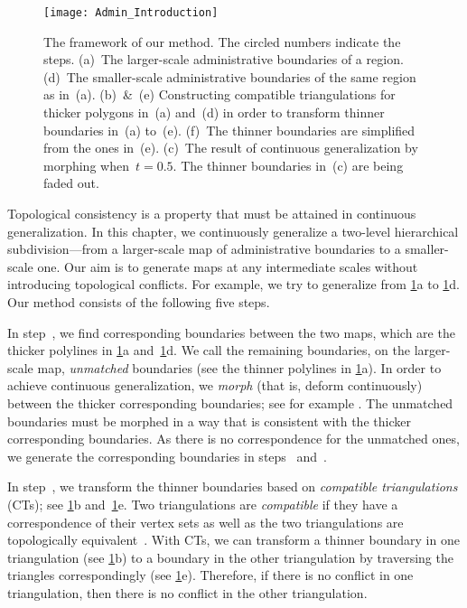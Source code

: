 \begin{figure}[tb]	
\centering
\texttt{[image: Admin\_Introduction]}
\caption{The framework of our method.
	The circled numbers indicate the steps. 
	(a)~The larger-scale administrative boundaries of a 
	region. 
	(d)~The smaller-scale administrative boundaries of the 
	same region as in~(a). 
	(b)~\&~(e) Constructing compatible triangulations for
	thicker polygons in~(a) and~(d) in order to 
	transform thinner boundaries in~(a) to~(e).
	(f)~The thinner boundaries are simplified from the 
	ones in~(e). 
	(c)~The result of continuous generalization
	by morphing when~$t=0.5$.
	The thinner boundaries in~(c) are being faded out.
	}
\label{fig:Admin_Introduction}
\end{figure}

Topological consistency is a property 
that must be attained in continuous generalization. 
In this chapter, we continuously generalize 
a two-level hierarchical subdivision---from 
a larger-scale map of administrative boundaries 
to a smaller-scale one.  
Our aim is to generate maps at any intermediate scales
without introducing topological conflicts.
For example, we try to generalize from
\fig\ref{fig:Admin_Introduction}a to
\fig\ref{fig:Admin_Introduction}d.
Our method consists of the following five steps.  


In step~, we find corresponding boundaries
between the two maps,
which are the thicker polylines in
\figs\ref{fig:Admin_Introduction}a 
and~\ref{fig:Admin_Introduction}d.  
We call the remaining boundaries, on the larger-scale map, 
\emph{unmatched} boundaries (see the
thinner polylines in \fig\ref{fig:Admin_Introduction}a). 
In order to achieve continuous generalization, 
we \emph{morph} (that is, deform continuously) 
between the thicker corresponding boundaries;
see for example \textcite{Noellenburg2008}.
The unmatched boundaries must be morphed in a way 
that is consistent with the thicker corresponding boundaries.  
As there is no correspondence for the unmatched ones, 
we generate the corresponding boundaries 
in steps~ and~.

In step~, we transform the thinner boundaries 
based on \emph{compatible triangulations} (CTs); 
see \figs\ref{fig:Admin_Introduction}b 
and~\ref{fig:Admin_Introduction}e. 
Two triangulations are \emph{compatible} 
if they have a correspondence of their vertex sets as well as 
the two triangulations are topologically 
equivalent~\parencite{Surazhsky2001}. 
With CTs, 
we can transform a thinner boundary in one triangulation 
(see \fig\ref{fig:Admin_Introduction}b) 
to a boundary in the other triangulation 
by traversing the triangles correspondingly 
(see \fig\ref{fig:Admin_Introduction}e). 
Therefore, if there is no conflict in one triangulation, 
then there is no conflict in the other triangulation.
 


